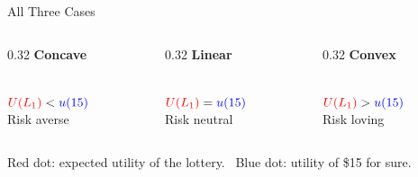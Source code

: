 \begin{frame}{All Three Cases}
\begin{columns}[T]
\begin{column}{0.32\textwidth}
\centering
\textbf{Concave}\\[4pt]
\\[4pt]
$\color{red}U(L_1)\color{black}<\color{blue}u(15)$\\[4pt]
Risk averse
\end{column}
\begin{column}{0.32\textwidth}
\centering
\textbf{Linear}\\[4pt]
\\[4pt]
$\color{red}U(L_1)\color{black}=\color{blue}u(15)$\\[4pt]
Risk neutral
\end{column}
\begin{column}{0.32\textwidth}
\centering
\textbf{Convex}\\[4pt]
\\[4pt]
$\color{red}U(L_1)\color{black}>\color{blue}u(15)$\\[4pt]
Risk loving
\end{column}
\end{columns}
\bsk
\centering
{\color{red}Red dot}: expected utility of the lottery. \ {\color{blue}Blue dot}: utility of \$15 for sure.
\end{frame}



